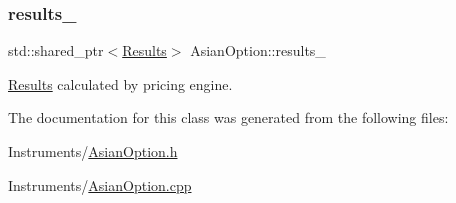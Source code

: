 \hypertarget{class_asian_option_aea29a8aff78cbe4101b4f060cedb6307}{}\label{class_asian_option_aea29a8aff78cbe4101b4f060cedb6307} 
\subsubsection{\texorpdfstring{results\+\_\+}{results\_}}
{\footnotesize\ttfamily std\+::shared\+\_\+ptr$<$\hyperlink{class_asian_option_1_1_results}{Results}$>$ Asian\+Option\+::results\+\_\+\hspace{0.3cm}{\ttfamily [private]}}



\hyperlink{class_asian_option_1_1_results}{Results} calculated by pricing engine. 



The documentation for this class was generated from the following files\+:\begin{DoxyCompactItemize}
\item 
Instruments/\hyperlink{_asian_option_8h}{Asian\+Option.\+h}\item 
Instruments/\hyperlink{_asian_option_8cpp}{Asian\+Option.\+cpp}\end{DoxyCompactItemize}
